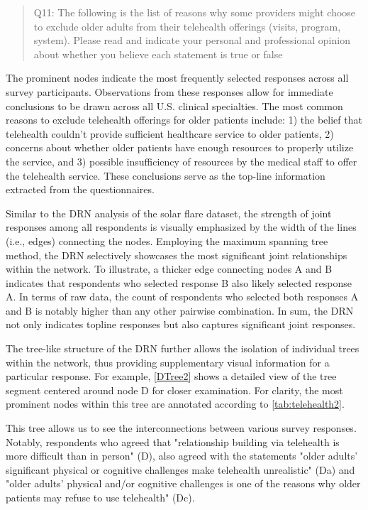 \begin{quotation}
\noindent Q11: The following is the list of reasons why some providers might choose to exclude older adults from their telehealth offerings (visits, program, system). Please read and indicate your personal and professional opinion about whether you believe each statement is true or false
\end{quotation}

The prominent nodes indicate the most frequently selected responses across all survey participants. Observations from these responses allow for immediate conclusions to be drawn across all U.S. clinical specialties. The most common reasons to exclude telehealth offerings for older patients include: 1) the belief that telehealth couldn't provide sufficient healthcare service to older patients, 2) concerns about whether older patients have enough resources to properly utilize the service, and 3) possible insufficiency of resources by the medical staff to offer the telehealth service. These conclusions serve as the top-line information extracted from the questionnaires.

Similar to the DRN analysis of the solar flare dataset, the strength of joint responses among all respondents is visually emphasized by the width of the lines (i.e., edges) connecting the nodes. Employing the maximum spanning tree method, the DRN selectively showcases the most significant joint relationships within the network. To illustrate, a thicker edge connecting nodes A and B indicates that respondents who selected response B also likely selected response A. In terms of raw data, the count of respondents who selected both responses A and B is notably higher than any other pairwise combination. In sum, the DRN not only indicates topline responses but also captures significant joint responses.

The tree-like structure of the DRN further allows the isolation of individual trees within the network, thus providing supplementary visual information for a particular response. For example, \autoref{DTree2} shows a detailed view of the tree segment centered around node D for closer examination.  For clarity, the most prominent nodes within this tree are annotated according to \autoref{tab:telehealth2}.

This tree allows us to see the interconnections between various survey responses. Notably, respondents who agreed that "relationship building via telehealth is more difficult than in person" (D), also agreed with the statements "older adults’ significant physical or cognitive challenges make telehealth unrealistic" (Da) and "older adults’ physical and/or cognitive challenges is one of the reasons why older patients may refuse to use telehealth" (Dc).

